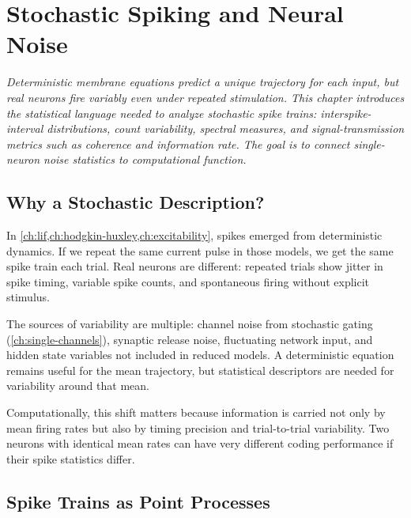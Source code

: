 \chapter{Stochastic Spiking and Neural Noise}
\label{ch:stochastic-spiking}

\textit{Deterministic membrane equations predict a unique trajectory for each input, but real neurons fire variably even under repeated stimulation. This chapter introduces the statistical language needed to analyze stochastic spike trains: interspike-interval distributions, count variability, spectral measures, and signal-transmission metrics such as coherence and information rate. The goal is to connect single-neuron noise statistics to computational function.}

\section{Why a Stochastic Description?}
\label{sec:why-stochastic}

In \cref{ch:lif,ch:hodgkin-huxley,ch:excitability}, spikes emerged from deterministic dynamics. If we repeat the same current pulse in those models, we get the same spike train each trial. Real neurons are different: repeated trials show jitter in spike timing, variable spike counts, and spontaneous firing without explicit stimulus.

The sources of variability are multiple: channel noise from stochastic gating (\cref{ch:single-channels}), synaptic release noise, fluctuating network input, and hidden state variables not included in reduced models. A deterministic equation remains useful for the mean trajectory, but statistical descriptors are needed for variability around that mean.

Computationally, this shift matters because information is carried not only by mean firing rates but also by timing precision and trial-to-trial variability. Two neurons with identical mean rates can have very different coding performance if their spike statistics differ.

\section{Spike Trains as Point Processes}
\label{sec:point-process}

